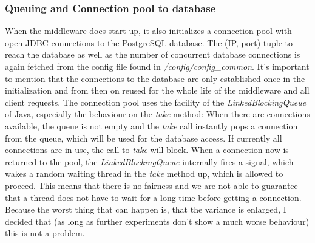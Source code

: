 \documentclass[11pt]{article}
\begin{document}
\subsubsection{Queuing and Connection pool to database}\label{sec:queuing-and-connection-pool-to-database}
When the middleware does start up, it also initializes a connection pool with open JDBC connections to the PostgreSQL database. The (IP, port)-tuple to reach the database as well as the number of concurrent database connections is again fetched from the config file found in \textit{/config/config\_common}. It's important to mention that the connections to the database are only established once in the initialization and from then on reused for the whole life of the middleware and all client requests. The connection pool uses the facility of the \textit{LinkedBlockingQueue} of Java, especially the behaviour on the \textit{take} method: When there are connections available, the queue is not empty and the \textit{take} call instantly pops a connection from the queue, which will be used for the database access. If currently all connections are in use, the call to \textit{take} will block. When a connection now is returned to the pool, the \textit{LinkedBlockingQueue} internally fires a signal, which wakes a random waiting thread in the \textit{take} method up, which is allowed to proceed. This means that there is no fairness and we are not able to guarantee that a thread does not have to wait for a long time before getting a connection. Because the worst thing that can happen is, that the variance is enlarged, I decided that (as long as further experiments don't show a much worse behaviour) this is not a problem.
\end{document}
